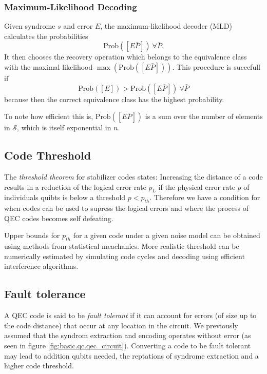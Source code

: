 \subsubsection{Maximum-Likelihood Decoding}
Given syndrome $s$ and error $E$, the maximum-likelihood decoder (MLD) calculates the probabilities 
\begin{equation}
    \text{Prob}([E\bar{P}])\ \forall \bar{P}.
\end{equation}
It then chooses the recovery operation which belongs to the equivalence class with the maximal likelihood $\max(\text{Prob}([E\bar{P}]))$.
This procedure is succefull if 
\begin{equation}
     \text{Prob}([E])>\text{Prob}([E\bar{P}])\ \forall \bar{P}
\end{equation}
because then the correct equivalence class has the highest probability. \cite{QECmemory}

To note how efficient this is, $\text{Prob}([E\bar{P}])$ is a sum over the number of elements in $\mathcal{S}$, which is itself exponential in $n$. \cite{QECmemory}


\subsection{Code Threshold}
The \textit{threshold theorem} for stabilizer codes states:
Increasing the distance of a code results in a reduction of the logical error rate $p_L$ 
if the physical error rate $p$ of individuals quibts is below a threshold $p<p_{th}$.
Therefore we have a condition for when codes can be used to supress the logical errors and where the process of QEC codes becomes self defeating. \cite{QECintro}

Upper bounds for $p_{th}$ for a given code under a given noise model can be obtained using methods from statistical meachanics.
More realistic threshold can be numerically estimated by simulating code cycles and decoding using efficient interference algorithms. \cite{QECintro}


\subsection{Fault tolerance}
A QEC code is said to be \textit{fault tolerant} if it can account for errors (of size up to the code distance) that occur at any location in the circuit.
We previously assumed that the syndrom extraction and encoding operates without error (as seen in figure \ref{fig:basic.qc.qec_circuit}).
Converting a code to be fault tolerant may lead to addition qubits needed, the reptations of syndrome extraction and a higher code threshold. \cite{QECintro}


